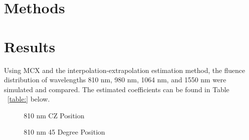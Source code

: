 \documentclass[journal,twoside,web]{ieeecolor}
\begin{document}
\section{Methods}
\label{sec:methods}

\section{Results}
\label{sec:results}

Using MCX and the interpolation-extrapolation estimation method, the fluence distribution of wavelengths 810 nm, 980 nm, 1064 nm, and 1550 nm were simulated and compared. 
The estimated coefficients can be found in Table ~\ref{table:} below.

\begin{figure}[!htb]
    \caption{\label{fig:810-CZ} 810 nm CZ Position}
\end{figure}

\begin{figure}[!htb]
    \caption{\label{fig:810-45} 810 nm 45 Degree Position}
\end{figure}
\end{document}

